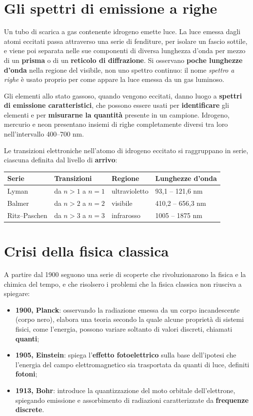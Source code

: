 \documentclass[11pt, a4paper, openright]{book}
\begin{document}
\section{Gli spettri di emissione a righe}
Un tubo di scarica a gas contenente idrogeno emette luce. La luce emessa dagli atomi eccitati passa attraverso una serie di fenditure, per isolare un fascio sottile, e viene poi separata nelle sue componenti di diversa lunghezza d'onda per mezzo di un \textbf{prisma} o di un \textbf{reticolo di diffrazione}. Si osservano \textbf{poche lunghezze d'onda} nella regione del visibile, non uno spettro continuo: il nome \emph{spettro a righe} è usato proprio per come appare la luce emessa da un gas luminoso.

Gli elementi allo stato gassoso, quando vengono eccitati, danno luogo a \textbf{spettri di emissione caratteristici}, che possono essere usati per \textbf{identificare} gli elementi e per \textbf{misurarne la quantità} presente in un campione. Idrogeno, mercurio e neon presentano insiemi di righe completamente diversi tra loro nell'intervallo 400--700 nm.

Le transizioni elettroniche nell'atomo di idrogeno eccitato si raggruppano in serie, ciascuna definita dal livello di \textbf{arrivo}:

\begin{center}
\begin{tabular}{llll}
\toprule
\textbf{Serie} & \textbf{Transizioni} & \textbf{Regione} & \textbf{Lunghezze d'onda} \\
\midrule
Lyman & da $n>1$ a $n=1$ & ultravioletto & 93,1 -- 121,6 nm \\
Balmer & da $n>2$ a $n=2$ & visibile & 410,2 -- 656,3 nm \\
Ritz--Paschen & da $n>3$ a $n=3$ & infrarosso & 1005 -- 1875 nm \\
\bottomrule
\end{tabular}
\end{center}

\newpage
\section{Crisi della fisica classica}
A partire dal 1900 seguono una serie di scoperte che rivoluzionarono la fisica e la chimica del tempo, e che risolsero i problemi che la fisica classica non riusciva a spiegare:
\begin{itemize}
    \item \textbf{1900, Planck}: osservando la radiazione emessa da un corpo incandescente (corpo nero), elabora una teoria secondo la quale alcune proprietà di sistemi fisici, come l'energia, possono variare soltanto di valori discreti, chiamati \textbf{quanti};
    \item \textbf{1905, Einstein}: spiega l'\textbf{effetto fotoelettrico} sulla base dell'ipotesi che l'energia del campo elettromagnetico sia trasportata da quanti di luce, definiti \textbf{fotoni};
    \item \textbf{1913, Bohr}: introduce la quantizzazione del moto orbitale dell'elettrone, spiegando emissione e assorbimento di radiazioni caratterizzate da \textbf{frequenze discrete}.
\end{itemize}
\end{document}
